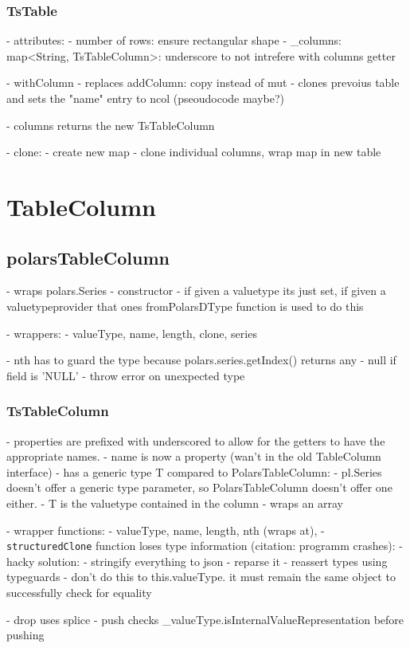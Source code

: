 \subsubsection{TsTable}
- attributes:
- number of rows: ensure rectangular shape
- _columns: map<String, TsTableColumn>: underscore to not intrefere with columns getter

- withColumn
- replaces addColumn: copy instead of mut
- clones prevoius table and sets the "name" entry to ncol (pseoudocode maybe?)

- columns returns the new TsTableColumn

- clone:
- create new map
- clone individual columns, wrap map in new table


\section{TableColumn}
\subsection{polarsTableColumn}
- wraps polars.Series
- constructor
- if given a valuetype its just set, if given a valuetypeprovider that ones fromPolarsDType function is used to do this

- wrappers:
- valueType, name, length, clone, series

- nth has to guard the type because polars.series.getIndex() returns any
- null if field is 'NULL'
- throw error on unexpected type


\subsubsection{TsTableColumn}
- properties are prefixed with underscored to allow for the getters to have the appropriate names.
- name is now a property (wan't in the old TableColumn interface)
- has a generic type T compared to PolarsTableColumn:
- pl.Series doesn't offer a generic type parameter, so PolarsTableColumn doesn't offer one either.
- T is the valuetype contained in the column
- wraps an array

- wrapper functions:
- valueType, name, length, nth (wraps at),
- \Verb|structuredClone| function loses type information (citation: programm crashes):
- hacky solution:
- stringify everything to json
- reparse it
- reassert types using typeguards
- don't do this to this.valueType. it must remain the same object to successfully check for equality

- drop uses splice
- push checks \_valueType.isInternalValueRepresentation before pushing

